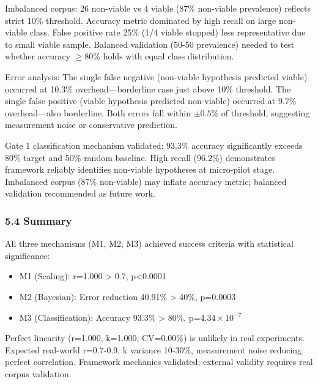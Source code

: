 Imbalanced corpus: 26 non-viable vs 4 viable (87\% non-viable prevalence) reflects strict 10\% threshold. Accuracy metric dominated by high recall on large non-viable class. False positive rate 25\% (1/4 viable stopped) less representative due to small viable sample. Balanced validation (50-50 prevalence) needed to test whether accuracy $\geq 80$\% holds with equal class distribution.

Error analysis: The single false negative (non-viable hypothesis predicted viable) occurred at 10.3\% overhead---borderline case just above 10\% threshold. The single false positive (viable hypothesis predicted non-viable) occurred at 9.7\% overhead---also borderline. Both errors fall within $\pm 0.5$\% of threshold, suggesting measurement noise or conservative prediction.

Gate 1 classification mechanism validated: 93.3\% accuracy significantly exceeds 80\% target and 50\% random baseline. High recall (96.2\%) demonstrates framework reliably identifies non-viable hypotheses at micro-pilot stage. Imbalanced corpus (87\% non-viable) may inflate accuracy metric; balanced validation recommended as future work.

\subsubsection{5.4 Summary}

All three mechanisms (M1, M2, M3) achieved success criteria with statistical significance:
\begin{itemize}
\item M1 (Scaling): r=1.000 > 0.7, p<0.0001
\item M2 (Bayesian): Error reduction 40.91\% > 40\%, p=0.0003
\item M3 (Classification): Accuracy 93.3\% > 80\%, p=4.$34\times 10^{-7}$
\end{itemize}

Perfect linearity (r=1.000, k=1.000, CV=0.00\%) is unlikely in real experiments. Expected real-world r=0.7-0.9, k variance 10-30\%, measurement noise reducing perfect correlation. Framework mechanics validated; external validity requires real corpus validation.
